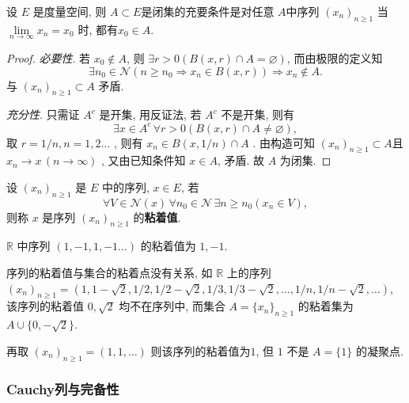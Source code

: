\documentclass[lang=cn,10pt]{gorgeousnbook}
\numberwithin{equation}{section}%
\numberwithin{figure}{section}%
\begin{document}
\begin{proposition}
	   设 $ E $ 是度量空间, 则 $ A\subset E $是闭集的充要条件是对任意 $ A $中序列  $ (x_{n})_{n\geqslant1} $ 当 $ \lim\limits_{n\to\infty}x_{n}=x_{0} $ 时, 都有$ x_{0}\in A $.
\end{proposition}

\begin{proof}
   \textsl{必要性}. 若 $ x_{0}\notin A $, 则 $ \exists r>0 (B(x, r)\cap A=\varnothing) $, 而由极限的定义知
   \[
      \exists n_{0}\in\mathcal{N}(n\geqslant n_{0}\Rightarrow x_{n}\in B(x, r))\Rightarrow x_{n}\notin A.
   \]
   与 $ (x_{n})_{n\geqslant1}\subset A $ 矛盾.

 \textsl{充分性}. 只需证 $ A^{c} $ 是开集, 用反证法, 若 $ A^{c} $ 不是开集, 则有
   \[
      \exists x\in A^{c}\,\forall r>0(B(x, r)\cap A\neq\varnothing),
   \]
   取 $ r=1/n, n=1, 2\ldots $ , 则有 $ x_{n}\in B(x, 1/n)\cap A $ . 由构造可知 $ (x_{n})_{n\geqslant1}\subset A $且 $ x_{n}\to x\,(n\to\infty) $  , 又由已知条件知 $ x\in A $, 矛盾. 故 $ A $ 为闭集. 
\end{proof}
 
\begin{definition}[序列的粘着值]\label{def:序列的粘着值}
设 $ (x_{n})_{n\geqslant1} $ 是 $ E $ 中的序列,  $ x\in E $, 若
\[\forall V\in\mathcal{N}(x)\,\forall n_{0}\in\mathcal{N}\,\exists n\geqslant n_{0}(x_{n}\in V),\]
则称 $ x $ 是序列 $ (x_{n})_{n\geqslant1} $ 的\textbf{粘着值}.
\end{definition}
 
\begin{exercise}
$\mathbb{R}$ 中序列 $ (1, -1, 1, -1\ldots) $ 的粘着值为 $ 1, -1 $.
\end{exercise}


\begin{remark}
序列的粘着值与集合的粘着点没有关系, 如 $\mathbb{R}$ 上的序列 $ (x_{n})_{n\geqslant1}=(1, 1-\sqrt{2}, {1}/{2}, {1}/{2}-\sqrt{2}, {1}/{3}, {1}/{3}-\sqrt{2}, \ldots, {1}/{n}, {1}/{n}-\sqrt{2}, \ldots) $, 该序列的粘着值 $ 0, \sqrt{2} $ 均不在序列中, 而集合 $ A=\{ x_{n} \}_{n\geqslant1} $ 的粘着集为 $ A\cup\{ 0,-\sqrt{2} \} $.

再取 $ (x_{n})_{n\geqslant1}=(1, 1, \ldots) $ 则该序列的粘着值为$1$,  但 $ 1 $ 不是 $ A=\{ 1 \} $ 的凝聚点.
\end{remark}

\subsubsection{Cauchy列与完备性}
\end{document}
